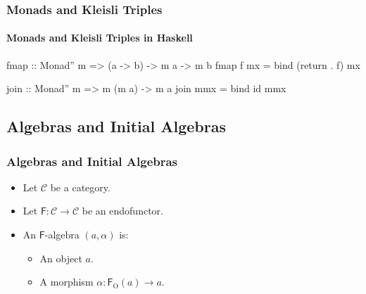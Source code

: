 \documentclass{beamer}
\DeclareMathOperator{\obj}{O}
\newcommand{\cat}[1]{\ensuremath{\mathcal{#1}}}
\newcommand{\func}[1]{\ensuremath{\mathsf{#1}}}
\newcommand{\funcO}[1]{\ensuremath{\func{#1}_{\obj}}}
\begin{document}

\begin{frame}[fragile]
  \frametitle{Monads and Kleisli Triples}
  \framesubtitle{Monads and Kleisli Triples in Haskell}

  \begin{block}{ \UseVerb{=} }
    \begin{code}
fmap :: Monad'' m => (a -> b) -> m a -> m b
fmap f mx = bind (return . f) mx

join :: Monad'' m => m (m a) -> m a
join mmx = bind id mmx
    \end{code}
  \end{block}

\end{frame}


\subsection{Algebras and Initial Algebras}


\begin{frame}
  \frametitle{Algebras and Initial Algebras}

  \begin{itemize}
  \item
    Let \cat{C} be a category.
  \item
    Let $\func{F}: \cat{C} \to \cat{C}$ be an endofunctor.
  \end{itemize}
  \begin{definition}[Algebra]
    \begin{itemize}
    \item
      An \func{F}-algebra $(a, \alpha)$ is:
      \begin{itemize}
      \item
        An object $a$.
      \item
        A morphism $\alpha: \funcO{F}(a) \to a$.
      \end{itemize}
    \end{itemize}
  \end{definition}

\end{frame}
\end{document}
